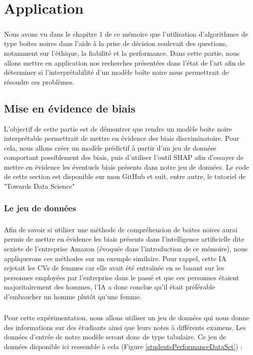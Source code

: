 \chapter{Application}
\paragraph{}Nous avons vu dans le chapitre 1 de ce mémoire que l'utilisation d'algorithmes de type boites noires dans l'aide à la prise de décision soulevait des questions, notamment sur l'éthique, la fiabilité et la performance. Dans cette partie, nous allons mettre en application nos recherches présentées dans l'état de l'art afin de déterminer si l'interprétabilité d'un modèle boîte noire nous permettrait de résoudre ces problèmes.
\section{Mise en évidence de biais}
L'objectif de cette partie est de démontrer que rendre un modèle boite noire interprétable permettrait de mettre en évidence des biais discriminatoire. Pour cela, nous allons créer un modèle prédictif à partir d'un jeu de données comportant possiblement des biais, puis d'utiliser l'outil SHAP afin d'essayer de mettre en évidence les éventuels biais présents dans notre jeu de données. Le code de cette section est disponible sur mon GitHub \cite{shapMyDepot} et suit, entre autre, le tutoriel de "Towards Data Science"\cite{shapTuto}

\subsection{Le jeu de données}
\paragraph{}Afin de savoir si utiliser une méthode de compréhension de boites noires aurai permis de mettre en évidence les biais présents dans l'intelligence artificielle dite sexiste de l'entreprise Amazon (évoquée dans l'introduction de ce mémoire), nous appliquerons ces méthodes sur un exemple similaire. Pour rappel, cette IA rejetait les CVs de femmes car elle avait été entraînée en se basant sur les personnes employées par l'entreprise dans le passé et que ces personnes étaient majoritairement des hommes, l'IA a donc conclue qu'il était préférable d'embaucher un homme plutôt qu'une femme.

\paragraph{}Pour cette expérimentation, nous allons utiliser un jeu de données qui nous donne des informations sur des étudiants ainsi que leurs notes à différents examens. Les données d'entrée de notre modèle seront donc de type tabulaire. Ce jeu de données disponible ici \cite{examScore} ressemble à cela (Figure \ref{studentsPerformanceDataSet}) :

